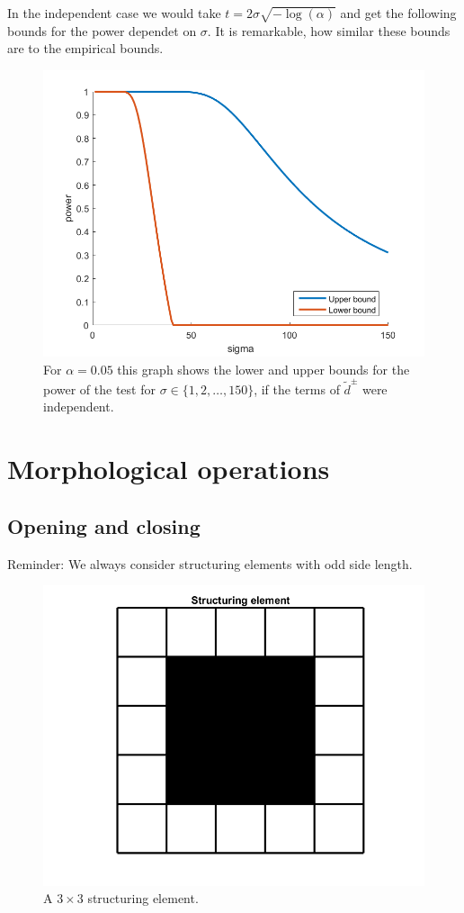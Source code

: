 \documentclass{beamer}
\begin{document}
\begin{frame}
	In the independent case we would take $t = 2 \sigma \sqrt{- \log(\alpha)}$ and get the following bounds for the power dependet on $\sigma$. It is remarkable, how similar these bounds are to the empirical bounds.
	
	\begin{figure}[h]
		\includegraphics[width=0.6\linewidth]{Testing/TheoreticalPower}
		\caption[Theoretical power bounds]{For $\alpha = 0.05$ this graph shows the lower and upper bounds for the power of the test for $\sigma \in \{ 1, 2, \dots, 150 \}$, if the terms of $\tilde{d}^\pm$ were independent.}
		\label{fig:TheoreticalPowerBounds}
	\end{figure}
\end{frame}

\section{Morphological operations}

\subsection{Opening and closing}

\begin{frame}
	Reminder: We always consider structuring elements with odd side length.
	
	\begin{figure}[h]
		\includegraphics[width=0.6\linewidth]{Morphology/StructuringElement}
		\caption[Structuring Element]{A $3 \times 3$ structuring element.}
		\label{fig:structuringelement}
	\end{figure}
\end{frame}
\end{document}
